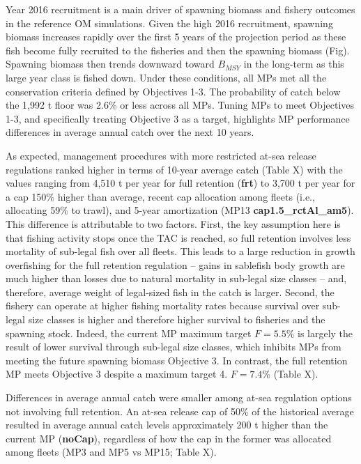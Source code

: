 \documentclass[11pt]{book}
\begin{document}
Year 2016 recruitment is a main driver of spawning biomass and fishery outcomes in the reference OM simulations. Given the high 2016 recruitment, spawning biomass increases rapidly over the first 5 years of the projection period as these fish become fully recruited to the fisheries and then the spawning biomass (Fig). Spawning biomass then trends downward toward \(B_{MSY}\) in the long-term as this large year class is fished down. Under these conditions, all MPs met all the conservation criteria defined by Objectives 1-3. The probability of catch below the 1,992 t floor was 2.6\% or less across all MPs. Tuning MPs to meet Objectives 1-3, and specifically treating Objective 3 as a target, highlights MP performance differences in average annual catch over the next 10 years.

As expected, management procedures with more restricted at-sea release regulations ranked higher in terms of 10-year average catch (Table X) with the values ranging from 4,510 t per year for full retention (\textbf{frt}) to 3,700 t per year for a cap 150\% higher than average, recent cap allocation among fleets (i.e., allocating 59\% to trawl), and 5-year amortization (MP13 \textbf{cap1.5\_rctAl\_am5}). This difference is attributable to two factors. First, the key assumption here is that fishing activity stops once the TAC is reached, so full retention involves less mortality of sub-legal fish over all fleets. This leads to a large reduction in growth overfishing for the full retention regulation -- gains in sablefish body growth are much higher than losses due to natural mortality in sub-legal size classes -- and, therefore, average weight of legal-sized fish in the catch is larger. Second, the fishery can operate at higher fishing mortality rates because survival over sub-legal size classes is higher and therefore higher survival to fisheries and the spawning stock. Indeed, the current MP maximum target \(F = 5.5\%\) is largely the result of lower survival through sub-legal size classes, which inhibits MPs from meeting the future spawning biomass Objective 3. In contrast, the full retention MP meets Objective 3 despite a maximum target 4. \(F = 7.4\%\) (Table X).

Differences in average annual catch were smaller among at-sea regulation options not involving full retention. An at-sea release cap of 50\% of the historical average resulted in average annual catch levels approximately 200 t higher than the current MP (\textbf{noCap}), regardless of how the cap in the former was allocated among fleets (MP3 and MP5 vs MP15; Table X).
\end{document}
